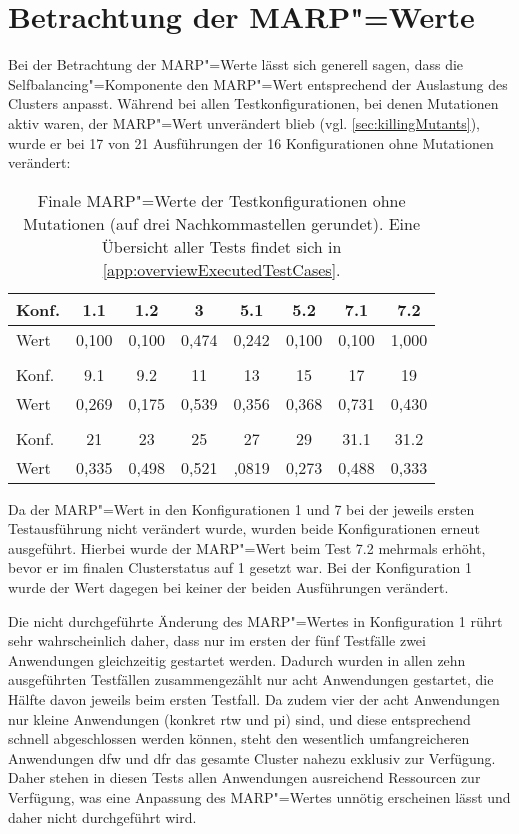 \section{Betrachtung der MARP"=Werte}
\label{sec:marpValueResults}

Bei der Betrachtung der \gls{MARP}"=Werte lässt sich generell sagen, dass die Selfbalancing"=Komponente den \gls{MARP}"=Wert entsprechend der Auslastung des Clusters anpasst.
Während bei allen Testkonfigurationen, bei denen Mutationen aktiv waren, der \gls{MARP}"=Wert unverändert blieb (vgl. \cref{sec:killingMutants}), wurde er bei 17 von 21 Ausführungen der 16 Konfigurationen ohne Mutationen verändert:

\begin{table}[h]
    \begin{tabular}{l|c|c|c|c|c|c|c}
    	Konf. &  1.1  &  1.2  &   3   &  5.1  &  5.2  &  7.1  &  7.2  \\ \hline
    	Wert  & 0,100 & 0,100 & 0,474 & 0,242 & 0,100 & 0,100 & 1,000 \\
    	\multicolumn{8}{c}{} \\
    	Konf. &  9.1  &  9.2  &  11   &  13   &  15   &  17   &  19   \\ \hline
    	Wert  & 0,269 & 0,175 & 0,539 & 0,356 & 0,368 & 0,731 & 0,430 \\
    	\multicolumn{8}{c}{} \\
    	Konf. &  21   &  23   &  25   &  27   &  29   & 31.1  & 31.2  \\ \hline
    	Wert  & 0,335 & 0,498 & 0,521 & ,0819 & 0,273 & 0,488 & 0,333
    \end{tabular}
    \caption[Finale "=Werte der Testkonfigurationen ohne Mutanten.]
    {Finale \acrshort{MARP}"=Werte der Testkonfigurationen ohne Mutationen (auf drei Nachkommastellen gerundet).
    Eine Übersicht aller Tests findet sich in \cref{app:overviewExecutedTestCases}.}
    \label{tab:finalMarpValues}
\end{table}

Da der \gls{MARP}"=Wert in den Konfigurationen 1 und 7 bei der jeweils ersten Testausführung nicht verändert wurde, wurden beide Konfigurationen erneut ausgeführt.
Hierbei wurde der \gls{MARP}"=Wert beim Test 7.2 mehrmals erhöht, bevor er im finalen Clusterstatus auf 1 gesetzt war.
Bei der Konfiguration 1 wurde der Wert dagegen bei keiner der beiden Ausführungen verändert.

Die nicht durchgeführte Änderung des \gls{MARP}"=Wertes in Konfiguration 1 rührt sehr wahrscheinlich daher, dass nur im ersten der fünf Testfälle zwei Anwendungen gleichzeitig gestartet werden.
Dadurch wurden in allen zehn ausgeführten Testfällen zusammengezählt nur acht Anwendungen gestartet, die Hälfte davon jeweils beim ersten Testfall.
Da zudem vier der acht Anwendungen nur kleine Anwendungen (konkret \acrlong{rtw} und \acrlong{pi}) sind, und diese entsprechend schnell abgeschlossen werden können, steht den wesentlich umfangreicheren Anwendungen \acrlong{dfw} und \acrlong{dfr} das gesamte Cluster nahezu exklusiv zur Verfügung.
Daher stehen in diesen Tests allen Anwendungen ausreichend Ressourcen zur Verfügung, was eine Anpassung des \gls{MARP}"=Wertes unnötig erscheinen lässt und daher nicht durchgeführt wird.

